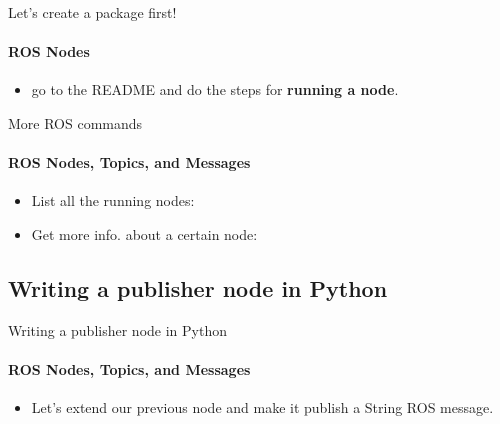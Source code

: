 \documentclass{beamer}
\begin{document}
\begin{frame}{Let's create a package first!}
    \framesubtitle{ROS Nodes}
    
    \begin{itemize}
        \item  go to the README and do the steps for \textbf{running a node}. 
    \end{itemize}   
\end{frame}


\begin{frame}{More ROS commands}
    \framesubtitle{ROS Nodes, Topics, and Messages}
    \begin{itemize}
        \item List all the running nodes:
        
        \begin{terminal}
            \color{green} 
        \end{terminal}
        
        \item Get more info. about a certain node:
        
        \begin{terminal}
            \color{green} 
        \end{terminal}
        
              
        
    \end{itemize}
    
\end{frame}


\subsection{Writing a publisher node in Python}

\begin{frame}[fragile]{Writing a publisher node in Python}
    \framesubtitle{ROS Nodes, Topics, and Messages}
    
    \begin{itemize}
        \item  Let's extend our previous node and make it publish a String ROS message.
    \end{itemize}   
\end{frame}
 
\end{document}
